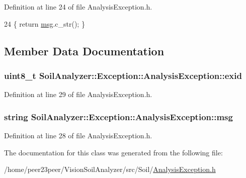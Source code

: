 Definition at line 24 of file Analysis\+Exception.\+h.


\begin{DoxyCode}
24 \{ \textcolor{keywordflow}{return} \hyperlink{class_soil_analyzer_1_1_exception_1_1_analysis_exception_a6bdd68db6677acb26738031746b761f4}{msg}.c\_str(); \}
\end{DoxyCode}


\subsection{Member Data Documentation}
\hypertarget{class_soil_analyzer_1_1_exception_1_1_analysis_exception_a2f79cb4a7d481fde0aabaf8930a123de}{}
\subsubsection[{exid}]{\setlength{\rightskip}{0pt plus 5cm}uint8\+\_\+t Soil\+Analyzer\+::\+Exception\+::\+Analysis\+Exception\+::exid\hspace{0.3cm}{\ttfamily [private]}}\label{class_soil_analyzer_1_1_exception_1_1_analysis_exception_a2f79cb4a7d481fde0aabaf8930a123de}


Definition at line 29 of file Analysis\+Exception.\+h.

\hypertarget{class_soil_analyzer_1_1_exception_1_1_analysis_exception_a6bdd68db6677acb26738031746b761f4}{}
\subsubsection[{msg}]{\setlength{\rightskip}{0pt plus 5cm}string Soil\+Analyzer\+::\+Exception\+::\+Analysis\+Exception\+::msg\hspace{0.3cm}{\ttfamily [private]}}\label{class_soil_analyzer_1_1_exception_1_1_analysis_exception_a6bdd68db6677acb26738031746b761f4}


Definition at line 28 of file Analysis\+Exception.\+h.



The documentation for this class was generated from the following file\+:\begin{DoxyCompactItemize}
\item 
/home/peer23peer/\+Vision\+Soil\+Analyzer/src/\+Soil/\hyperlink{_analysis_exception_8h}{Analysis\+Exception.\+h}\end{DoxyCompactItemize}
